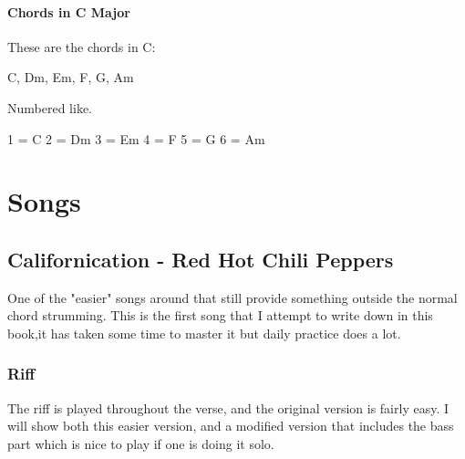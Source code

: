 \documentclass[11pt]{book}
\begin{document}
    \scales[
    name = C Major
    position = 1,
    finger = {
    1/1:1,3/1:3,
    1/2:1,3/2:3,
    2/3:2,
    2/4:2,3/4:3,
    2/5:2,3/5:3,
    1/6:2,3/6:3
    }
    ]

    \subsubsection{Chords in C Major}
    These are the chords in C:

    C, Dm, Em, F, G, Am

    Numbered like.

    1 = C
    2 = Dm
    3 = Em
    4 = F
    5 = G
    6 = Am


    \chapter{Songs}


    \section{Californication - Red Hot Chili Peppers}
    One of the "easier" songs around that still provide something outside the normal chord strumming.
    This is the first song that I attempt to write down in this book,it has taken some time to master it but daily practice does a lot.

    \subsection{Riff}
    The riff is played throughout the verse, and the original version is fairly easy.
    I will show both this easier version, and a modified version that includes the bass part which is nice to play if one is doing it solo.
\end{document}
